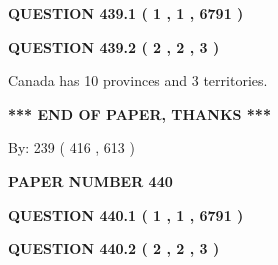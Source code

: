 \documentclass[12pt]{article}
\begin{document}
   
  
\vspace{0.2in}
  
{\textbf{\Large{QUESTION
439.1 
 ( 1 , 1 , 6791 )
}}}
  
  
  
\vspace{0.2in}
  
{\textbf{\Large{QUESTION
439.2 
 ( 2 , 2 , 3 )
}}}
  
  
 
 
\noindent{}
 
 
Canada has 10  provinces and 3 territories.
 
 
 
 
   
   
 \vspace{0.2in}
 
   
   
   
   
\vspace{1.0in} 
{\textbf{\large{ *** END OF PAPER, THANKS *** }}} 
   
   
\hspace{1.0in} By: 
 239 ( 416 ,  613 )
   
   
   
   
\newpage 
\setcounter{page}{ 
   440001 } 
   
   
   
   
 {\textbf{ \Large{ PAPER NUMBER  440  }}}
   
   
\vspace{0.2in}
   
   
   
   
   
   
 \vspace{0.2in}
 
 
 
 
   
   
  
\vspace{0.2in}
  
{\textbf{\Large{QUESTION
440.1 
 ( 1 , 1 , 6791 )
}}}
  
  
  
\vspace{0.2in}
  
{\textbf{\Large{QUESTION
440.2 
 ( 2 , 2 , 3 )
}}}
  
\end{document}
